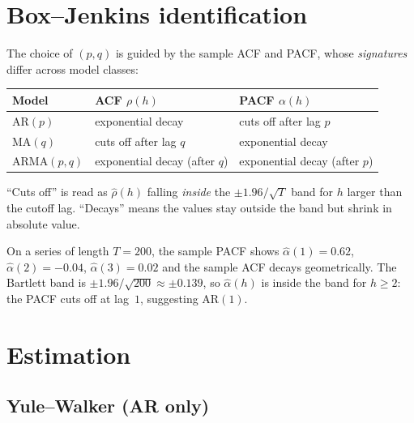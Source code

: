 \section{Box--Jenkins identification}
\label{sec:identification}

The choice of $(p, q)$ is guided by the sample ACF and PACF, whose
\emph{signatures} differ across model classes:

\begin{center}
\renewcommand{\arraystretch}{1.4}
\begin{tabular}{lll}
\toprule
Model        & ACF $\rho(h)$              & PACF $\alpha(h)$ \\
\midrule
AR$(p)$      & exponential decay          & cuts off after lag $p$ \\
MA$(q)$      & cuts off after lag $q$     & exponential decay \\
ARMA$(p, q)$ & exponential decay (after $q$) & exponential decay (after $p$) \\
\bottomrule
\end{tabular}
\end{center}

\begin{rembox}
``Cuts off'' is read as $\widehat\rho(h)$ falling \emph{inside} the
$\pm 1.96 / \sqrt T$ band for $h$ larger than the cutoff lag.
``Decays'' means the values stay outside the band but shrink in
absolute value.
\end{rembox}

\begin{exbox}
On a series of length $T = 200$, the sample PACF shows
$\widehat\alpha(1) = 0.62$, $\widehat\alpha(2) = -0.04$,
$\widehat\alpha(3) = 0.02$ and the sample ACF decays geometrically.
The Bartlett band is $\pm 1.96 / \sqrt{200} \approx \pm 0.139$, so
$\widehat\alpha(h)$ is inside the band for $h \geq 2$:
the PACF cuts off at lag~$1$, suggesting AR$(1)$.
\end{exbox}

\section{Estimation}
\label{sec:arma-estimation}

\subsection{Yule--Walker (AR only)}

